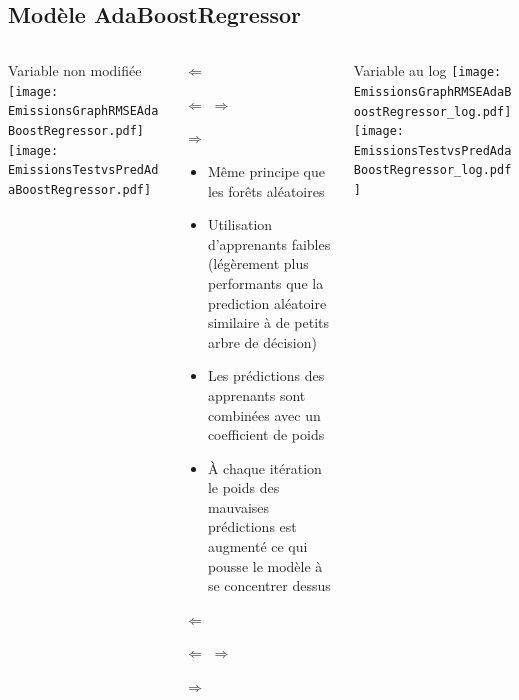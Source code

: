 \documentclass[8pt,aspectratio=169,hyperref={unicode=true}]{beamer}
\begin{document}
\subsection{Modèle AdaBoostRegressor}
\begin{frame}{\insertsubsection}
  \begin{columns}[t]
    \begin{column}{.33\textwidth}
      \centering Variable non modifiée
      \texttt{[image: EmissionsGraphRMSEAdaBoostRegressor.pdf]}
      \texttt{[image: EmissionsTestvsPredAdaBoostRegressor.pdf]}
    \end{column}
    \begin{column}{.33\textwidth}
      $\Longleftarrow$

      {\tiny
      }

      $\Longleftarrow$ \hfill $\Longrightarrow$
      
      \raggedleft
      {\tiny
      }

      $\Longrightarrow$

      \scriptsize
      \begin{itemize}
        \item Même principe que les forêts aléatoires
        \item Utilisation d'apprenants faibles (légèrement plus performants que la prediction aléatoire
              similaire à de petits arbre de décision)
        \item Les prédictions des apprenants sont combinées avec un coefficient de poids
        \item À chaque itération le poids des mauvaises prédictions est augmenté ce qui pousse le modèle
              à se concentrer dessus
      \end{itemize}

      \normalsize
      \raggedright
      $\Longleftarrow$

      {\tiny
          }

      $\Longleftarrow$ \hfill $\Longrightarrow$

      \raggedleft
      {\tiny
          
        }

      $\Longrightarrow$
    \end{column}
    \begin{column}{.33\textwidth}
      \centering Variable au log
      \texttt{[image: EmissionsGraphRMSEAdaBoostRegressor\_log.pdf]}
      \texttt{[image: EmissionsTestvsPredAdaBoostRegressor\_log.pdf]}
    \end{column}
  \end{columns}
\end{frame}
\end{document}
